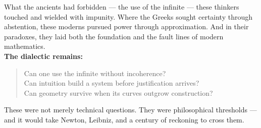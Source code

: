 \documentclass[9pt]{article}
\begin{document}
What the ancients had forbidden — the use of the infinite — these thinkers touched and wielded with impunity. Where the Greeks sought certainty through abstention, these moderns pursued power through approximation. And in their paradoxes, they laid both the foundation and the fault lines of modern mathematics.\\

\textbf{The dialectic remains:}\\

\begin{quote}
Can one use the infinite without incoherence? \\
Can intuition build a system before justification arrives? \\
Can geometry survive when its curves outgrow construction?
\end{quote}

These were not merely technical questions. They were philosophical thresholds — and it would take Newton, Leibniz, and a century of reckoning to cross them.
\end{document}
